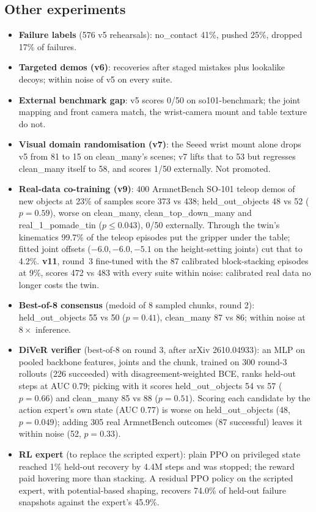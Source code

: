 \documentclass[10pt]{article}
\begin{document}
\subsection{Other experiments}
\begin{itemize}\itemsep0pt
\item \textbf{Failure labels} (576 v5 rehearsals): no\_contact 41\%, pushed 25\%, dropped 17\% of failures.
\item \textbf{Targeted demos (v6)}: recoveries after staged mistakes plus lookalike decoys; within noise of v5 on every
suite.
\item \textbf{External benchmark gap}: v5 scores 0/50 on so101-benchmark; the joint mapping and front camera match, the
wrist-camera mount and table texture do not.
\item \textbf{Visual domain randomisation (v7)}: the Seeed wrist mount alone drops v5 from 81 to 15 on clean\_many's scenes;
v7 lifts that to 53 but regresses clean\_many itself to 58, and scores 1/50 externally. Not promoted.
\item \textbf{Real-data co-training (v9)}: 400 ArmnetBench SO-101 teleop demos of new objects at 23\% of samples score 373 vs 438;
held\_out\_objects 48 vs 52 ($p=0.59$), worse on clean\_many, clean\_top\_down\_many and real\_1\_pomade\_tin ($p\le0.043$), 0/50 externally.
Through the twin's kinematics 99.7\% of the teleop episodes put the gripper under the table; fitted joint offsets
($-6.0, -6.0, -5.1$ on the height-setting joints) cut that to 4.2\%. \textbf{v11}, round~3 fine-tuned with the 87 calibrated
block-stacking episodes at 9\%, scores 472 vs 483 with every suite within noise: calibrated real data no longer costs the twin.
\item \textbf{Best-of-8 consensus} (medoid of 8 sampled chunks, round 2): held\_out\_objects 55 vs 50 ($p=0.41$),
clean\_many 87 vs 86; within noise at $8\times$ inference.
\item \textbf{DiVeR verifier} (best-of-8 on round 3, after arXiv 2610.04933): an MLP on pooled backbone features, joints and
the chunk, trained on 300 round-3 rollouts (226 succeeded) with disagreement-weighted BCE, ranks held-out steps at AUC 0.79;
picking with it scores held\_out\_objects 54 vs 57 ($p=0.66$) and clean\_many 85 vs 88 ($p=0.51$).
Scoring each candidate by the action expert's own state (AUC 0.77) is worse on held\_out\_objects (48, $p=0.049$); adding 305 real
ArmnetBench outcomes (87 successful) leaves it within noise (52, $p=0.33$).
\item \textbf{RL expert} (to replace the scripted expert): plain PPO on privileged state reached 1\% held-out recovery
by 4.4M steps and was stopped; the reward paid hovering more than stacking. A residual PPO policy on the scripted
expert, with potential-based shaping, recovers 74.0\% of held-out failure snapshots against the expert's 45.9\%.
\end{itemize}
\end{document}
